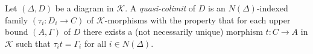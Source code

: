 Let $(\Delta, D)$ be a diagram in $\mathcal{K}$. A \textit{quasi-colimit} of $D$ is an $N(\Delta)$-indexed family $(\tau_i: D_i \longrightarrow C)$ of $\mathcal{K}$-morphisms with the property that for each upper bound $(A, \Gamma)$ of $D$ there exists a (not necessarily unique) morphism $t: C \longrightarrow A$ in $\mathcal{K}$ such that $\tau_i t = \Gamma_i$ for all $i \in N(\Delta)$.
